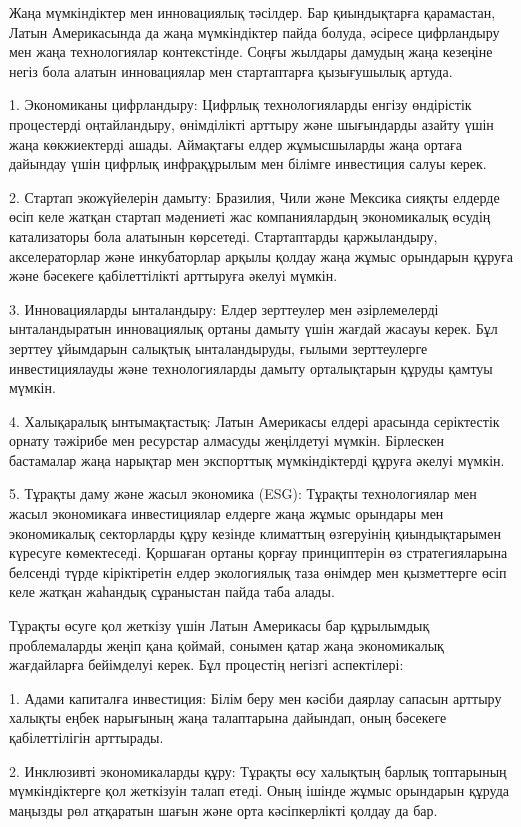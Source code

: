 \begin{multicols}{2}
Жаңа мүмкіндіктер мен инновациялық тәсілдер. Бар қиындықтарға
қарамастан, Латын Америкасында да жаңа мүмкіндіктер пайда болуда,
әсіресе цифрландыру мен жаңа технологиялар контекстінде. Соңғы жылдары
дамудың жаңа кезеңіне негіз бола алатын инновациялар мен стартаптарға
қызығушылық артуда.

1. Экономиканы цифрландыру: Цифрлық технологияларды енгізу өндірістік
процестерді оңтайландыру, өнімділікті арттыру және шығындарды азайту
үшін жаңа көкжиектерді ашады. Аймақтағы елдер жұмысшыларды жаңа ортаға
дайындау үшін цифрлық инфрақұрылым мен білімге инвестиция салуы керек.

2. Стартап экожүйелерін дамыту: Бразилия, Чили және Мексика сияқты
елдерде өсіп келе жатқан стартап мәдениеті жас компаниялардың
экономикалық өсудің катализаторы бола алатынын көрсетеді. Стартаптарды
қаржыландыру, акселераторлар және инкубаторлар арқылы қолдау жаңа жұмыс
орындарын құруға және бәсекеге қабілеттілікті арттыруға әкелуі мүмкін.

3. Инновацияларды ынталандыру: Елдер зерттеулер мен әзірлемелерді
ынталандыратын инновациялық ортаны дамыту үшін жағдай жасауы керек. Бұл
зерттеу ұйымдарын салықтық ынталандыруды, ғылыми зерттеулерге
инвестициялауды және технологияларды дамыту орталықтарын құруды қамтуы
мүмкін.

4. Халықаралық ынтымақтастық: Латын Америкасы елдері арасында
серіктестік орнату тәжірибе мен ресурстар алмасуды жеңілдетуі мүмкін.
Бірлескен бастамалар жаңа нарықтар мен экспорттық мүмкіндіктерді құруға
әкелуі мүмкін.

5. Тұрақты даму және жасыл экономика (ESG): Тұрақты технологиялар мен
жасыл экономикаға инвестициялар елдерге жаңа жұмыс орындары мен
экономикалық секторларды құру кезінде климаттың өзгеруінің
қиындықтарымен күресуге көмектеседі. Қоршаған ортаны қорғау принциптерін
өз стратегияларына белсенді түрде кіріктіретін елдер экологиялық таза
өнімдер мен қызметтерге өсіп келе жатқан жаһандық сұраныстан пайда таба
алады.

Тұрақты өсуге қол жеткізу үшін Латын Америкасы бар құрылымдық
проблемаларды жеңіп қана қоймай, сонымен қатар жаңа экономикалық
жағдайларға бейімделуі керек. Бұл процестің негізгі аспектілері:

1. Адами капиталға инвестиция: Білім беру мен кәсіби даярлау сапасын
арттыру халықты еңбек нарығының жаңа талаптарына дайындап, оның бәсекеге
қабілеттілігін арттырады.

2. Инклюзивті экономикаларды құру: Тұрақты өсу халықтың барлық
топтарының мүмкіндіктерге қол жеткізуін талап етеді. Оның ішінде жұмыс
орындарын құруда маңызды рөл атқаратын шағын және орта кәсіпкерлікті
қолдау да бар.


\end{multicols}
